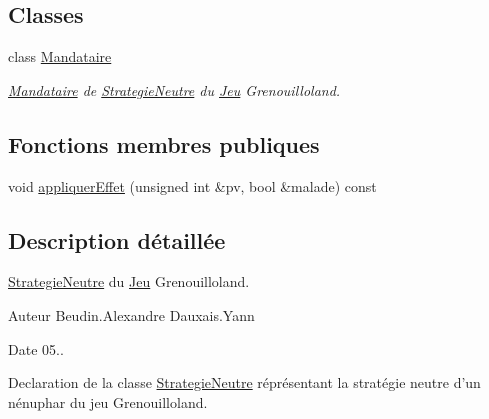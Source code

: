 \subsection*{Classes}
\begin{DoxyCompactItemize}
\item 
class \hyperlink{classgrenouilloland_1_1StrategieNeutre_1_1Mandataire}{Mandataire}
\begin{DoxyCompactList}\small\item\em \hyperlink{classgrenouilloland_1_1StrategieNeutre_1_1Mandataire}{Mandataire} de \hyperlink{classgrenouilloland_1_1StrategieNeutre}{Strategie\-Neutre} du \hyperlink{classgrenouilloland_1_1Jeu}{Jeu} Grenouilloland. \end{DoxyCompactList}\end{DoxyCompactItemize}
\subsection*{Fonctions membres publiques}
\begin{DoxyCompactItemize}
\item 
void \hyperlink{classgrenouilloland_1_1StrategieNeutre_a8e6c41ebe5ed9c0477ad3e203f766567}{appliquer\-Effet} (unsigned int \&pv, bool \&malade) const 
\end{DoxyCompactItemize}


\subsection{Description détaillée}
\hyperlink{classgrenouilloland_1_1StrategieNeutre}{Strategie\-Neutre} du \hyperlink{classgrenouilloland_1_1Jeu}{Jeu} Grenouilloland. 

\begin{DoxyAuthor}{Auteur}
Beudin.\-Alexandre Dauxais.\-Yann 
\end{DoxyAuthor}
\begin{DoxyDate}{Date}
05..
\end{DoxyDate}
Declaration de la classe \hyperlink{classgrenouilloland_1_1StrategieNeutre}{Strategie\-Neutre} réprésentant la stratégie neutre d'un nénuphar du jeu Grenouilloland. 

